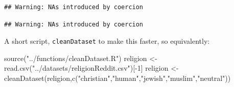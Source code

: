 \documentclass[
  12pt,
]{book}
\newenvironment{Shaded}{\begin{snugshade}}{\end{snugshade}}
\newcommand{\DecValTok}[1]{\textcolor[rgb]{0.00,0.00,0.81}{#1}}
\newcommand{\FunctionTok}[1]{\textcolor[rgb]{0.00,0.00,0.00}{#1}}
\newcommand{\NormalTok}[1]{#1}
\newcommand{\OtherTok}[1]{\textcolor[rgb]{0.56,0.35,0.01}{#1}}
\newcommand{\SpecialCharTok}[1]{\textcolor[rgb]{0.00,0.00,0.00}{#1}}
\newcommand{\StringTok}[1]{\textcolor[rgb]{0.31,0.60,0.02}{#1}}
\begin{document}
\vspace{1mm}
\footnotesize

\begin{Shaded}
\end{Shaded}

\begin{verbatim}
## Warning: NAs introduced by coercion
\end{verbatim}

\begin{Shaded}
\end{Shaded}

\begin{verbatim}
## Warning: NAs introduced by coercion
\end{verbatim}

\begin{Shaded}
\end{Shaded}

\normalsize

A short script, \texttt{cleanDataset} to make this faster, so equivalently:

\vspace{1mm}
\footnotesize

\begin{Shaded}
\begin{Highlighting}[]
\FunctionTok{source}\NormalTok{(}\StringTok{"../functions/cleanDataset.R"}\NormalTok{)}
\NormalTok{religion }\OtherTok{\textless{}{-}} \FunctionTok{read.csv}\NormalTok{(}\StringTok{"../datasets/religionReddit.csv"}\NormalTok{)[}\SpecialCharTok{{-}}\DecValTok{1}\NormalTok{]}
\NormalTok{religion }\OtherTok{\textless{}{-}} \FunctionTok{cleanDataset}\NormalTok{(religion,}\FunctionTok{c}\NormalTok{(}\StringTok{"christian"}\NormalTok{,}\StringTok{"human"}\NormalTok{,}\StringTok{"jewish"}\NormalTok{,}\StringTok{"muslim"}\NormalTok{,}\StringTok{"neutral"}\NormalTok{))}
\end{Highlighting}
\end{Shaded}
\end{document}
